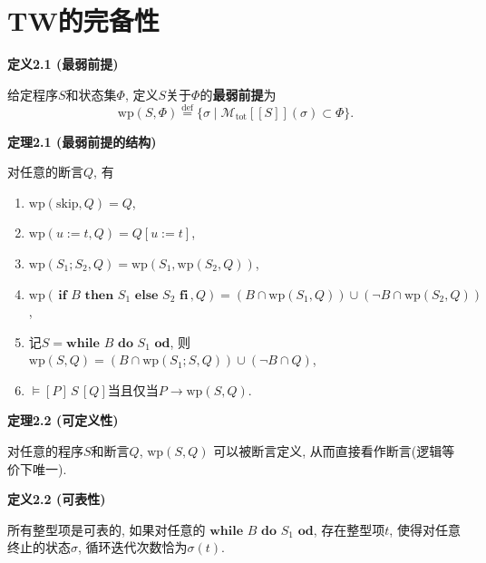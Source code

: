 \documentclass[UTF8]{ctexart}
\begin{document}
\newpage

\section{TW的完备性}

\hypertarget{sec:定义2.1}{}
\noindent\textbf{定义2.1 (最弱前提)}

给定程序$S$和状态集$\Phi$, 定义$S$关于$\Phi$的\textbf{最弱前提}为
\[
    \mathrm{wp}(S,\Phi)\overset{\mathrm{def}}{=}\{\sigma\mid
    \mathcal{M}_{\mathrm{tot}}[\![S]\!](\sigma)\subset\Phi\}.
\]

\vspace{10pt}

\hypertarget{sec:定理2.1}{}
\noindent\textbf{定理2.1 (最弱前提的结构)}

对任意的断言$Q$, 有
\begin{enumerate}
    \item $\mathrm{wp}(\mathrm{skip},Q)=Q$,
    \item $\mathrm{wp}(u:=t,Q)=Q[u:=t]$,
    \item $\mathrm{wp}(S_1;S_2,Q)=\mathrm{wp}(S_1,\mathrm{wp}(S_2,Q))$,
    \item $\mathrm{wp}(\,\mathbf{if}\,\,B\,\,\mathbf{then}\,\,S_1\,\,
        \mathbf{else}\,\,S_2\,\,\mathbf{fi}\,,Q)
        =(B\cap\mathrm{wp}(S_1,Q))\cup(\neg B\cap\mathrm{wp}(S_2,Q))$,
    \item 记$S=\mathbf{while}\,\,B\,\,\mathbf{do}\,\,S_1\,\,\mathbf{od}$, 则
    $\mathrm{wp}(S,Q)=(B\cap\mathrm{wp}(S_1;S,Q))\cup(\neg B\cap Q)$,
    \item $\models[P]\,S\,[Q]$当且仅当$P\to\mathrm{wp}(S,Q)$.
\end{enumerate}

\vspace{10pt}

\hypertarget{sec:定理2.2}{}
\noindent\textbf{定理2.2 (可定义性)}

对任意的程序$S$和断言$Q$, $\mathrm{wp}(S,Q)$
可以被断言定义, 从而直接看作断言(逻辑等价下唯一).

\vspace{10pt}

\hypertarget{sec:定义2.2}{}
\noindent\textbf{定义2.2 (可表性)}

所有整型项是可表的, 如果对任意的
$\mathbf{while}\,\,B\,\,\mathbf{do}\,\,S_1\,\,\mathbf{od}$,
存在整型项$t$, 使得对任意终止的状态$\sigma$, 循环迭代次数恰为$\sigma(t)$.

\vspace{10pt}
\end{document}
